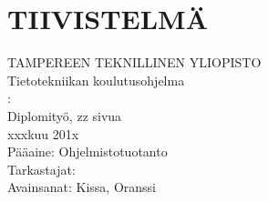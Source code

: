 \newpage
\chapter*{TIIVISTELMÄ}
\begin{spacing}{1.0}
\textsf{TAMPEREEN TEKNILLINEN YLIOPISTO}\\
\textsf{Tietotekniikan koulutusohjelma}\\
{\bf \textsf{\NIMI}}: \textsf{\OTSIKKO}\\
\textsf{Diplomityö, zz sivua}\\
\textsf{xxxkuu 201x}\\
\textsf{Pääaine: Ohjelmistotuotanto}\\
\textsf{Tarkastajat: \TARKASTAJA}\\
\textsf{Avainsanat: Kissa, Oranssi }\\



\end{spacing}
